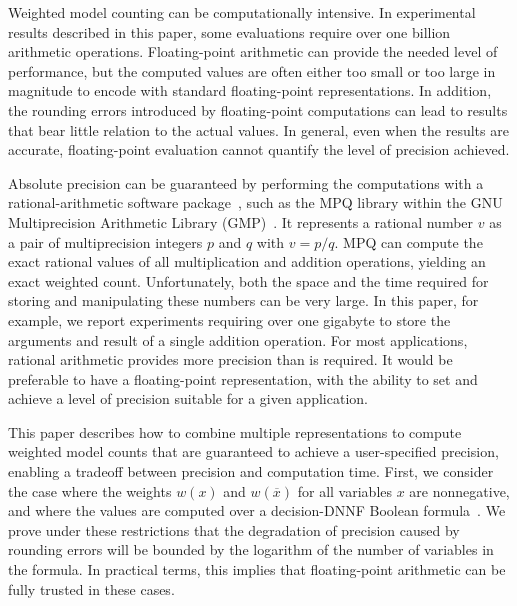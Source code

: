 \documentclass{easychair}
\newcommand{\obar}[1]{\overline{#1}}
\begin{document}
Weighted model counting can be computationally intensive.  In
experimental results described in this paper, some evaluations 
require over one billion arithmetic operations.
Floating-point arithmetic can provide the needed level of performance,
but the computed values are often either too small or too
large in magnitude to encode with standard floating-point
representations.  In addition, the rounding errors
introduced by floating-point computations can lead to results
that bear little relation to the actual values.  In general, even when the results are accurate,
floating-point evaluation cannot quantify the level of precision achieved.

Absolute precision can be guaranteed by performing the
computations with a rational-arithmetic software package~\cite{knuth:rational:1981}, such as the
MPQ library within the GNU Multiprecision Arithmetic
Library (GMP)~\cite{granlund:gmp:2015}.  It represents a rational number $v$ as a
pair of multiprecision integers $p$ and $q$ with $v = p/q$.
MPQ
can compute the exact rational values of all multiplication and
addition operations, yielding an exact weighted count.  Unfortunately,
both the space and the time required for storing and manipulating these numbers can be very
large.
In this paper, for example, we report experiments requiring over one gigabyte
to store the arguments and result of a single addition operation.
For most applications, rational arithmetic provides more precision than is required.
It would be preferable to have a floating-point
representation, with the ability to set and achieve a level of precision suitable for a given application.

This paper describes how to combine multiple representations to
compute weighted model counts that are guaranteed to achieve a
user-specified precision, enabling a tradeoff between precision and
computation time.  First, we consider the case where the weights
$w(x)$ and $w(\obar{x})$ for all variables $x$ are nonnegative, and
where the values are computed over a decision-DNNF Boolean
formula~\cite{beame:uai:2013,huang:jair:2007}.  We prove under these
restrictions that the degradation of precision caused by rounding
errors will be bounded by the logarithm of the number of variables in
the formula.  In practical terms, this implies that floating-point
arithmetic can be fully trusted in these cases.
\end{document}

